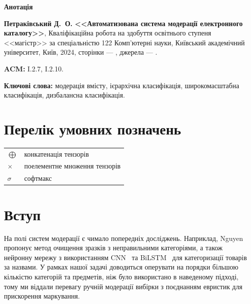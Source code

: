 \documentclass[fleqn,12pt,a4paper]{report}
\theoremstyle{plain}
\theoremstyle{definition}
\numberwithin{equation}{chapter}
\numberwithin{figure}{chapter}
\numberwithin{table}{chapter}
\numberwithin{footnote}{chapter}
\numberwithin{figure}{chapter}
\numberwithin{theorem}{chapter}
\numberwithin{definition}{chapter}
\begin{document}
    \begin{center}
        \Large \textbf{Анотація}
    \end{center}
    \noindent
    \textbf{Петраківський Д.~О.} \textbf{<<Автоматизована система модерації електронного каталогу>>}, Кваліфікаційна
    робота на здобуття освітнього ступеня <<магістр>> за спеціальністю 122 Комп'ютерні науки, Київський академічний
    університет, Київ, 2024, сторінки --- \ztotpages, джерела --- .

    \bigskip
    \noindent
    \textbf{ACM:} I.2.7, I.2.10.

    \bigskip
    \noindent
    \textbf{Ключові слова:} модерація вмісту, ієрархічна класифікація, широкомасштабна класифікація, дизбалансна
    класифікація.

    \newpage
    \tableofcontents

    \newpage

    \chapter*{Перелік умовних позначень}\label{ch:conventions}

    \bigskip
    \begin{tabular}{ll}
        $\bigoplus$ & конкатенація тензорів         \\
        $\times$    & поелементне множення тензорів \\
        $\sigma$    & софтмакс
    \end{tabular}

    \newpage

    \listoffigures

    \newpage

    \chapter*{Вступ}\label{ch:introduction}

    На полі систем модерації є чимало попередніх досліджень.
    Наприклад, Nguyen~\cite{Nguyen2022} пропонує метод очищення зразків з неправильними категоріями, а також нейронну
    мережу з використанням CNN~\cite{Lecun1998} та BiLSTM~\cite{Schuster1997} для категоризації товарів за назвами.
    У рамках нашої задачі доводиться оперувати на порядки більшою кількістю категорій та предметів, ніж було
    використано в наведеному підході, тому ми віддали перевагу ручній модерації вибірки з поєднанням евристик для
    прискорення маркування.
\end{document}
